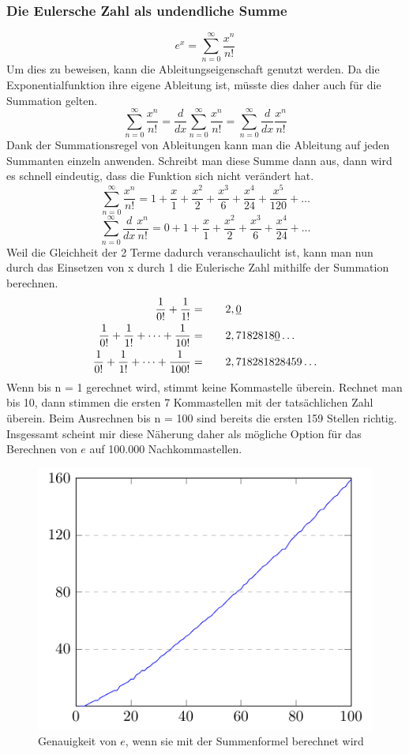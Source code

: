 \subsubsection{Die Eulersche Zahl als undendliche Summe}
\[e^x = \sum_{n=0}^\infty \frac{x^n}{n!}
  \]Um dies zu beweisen, kann die Ableitungseigenschaft genutzt werden. Da die Exponentialfunktion ihre eigene Ableitung ist, müsste dies daher auch für die Summation gelten.  \[
  \sum_{n=0}^\infty \frac{x^n}{n!} = \frac{d}{dx}\sum_{n=0}^\infty \frac{x^n}{n!} = \sum_{n=0}^\infty \frac{d}{dx}\frac{x^n}{n!} 
  \] Dank der Summationsregel von Ableitungen kann man die Ableitung auf jeden Summanten einzeln anwenden. Schreibt man diese Summe dann aus, dann wird es schnell eindeutig, dass die Funktion sich nicht verändert hat. \[
  \sum_{n=0}^\infty \frac{x^n}{n!} = 1 + \frac{x}{1} + \frac{x^2}{2} + \frac{x^3}{6} + \frac{x^4}{24} + \frac{x^5}{120} + \dots
  \] \[
  \sum_{n=0}^\infty \frac{d}{dx}\frac{x^{n}}{n!} = 0 +  1 + \frac{x}{1} + \frac{x^2}{2} + \frac{x^3}{6} + \frac{x^4}{24} + \dots
\]Weil die Gleichheit der 2 Terme dadurch veranschaulicht ist, kann man nun durch das Einsetzen von x durch 1 die Eulerische Zahl mithilfe der Summation berechnen. \[
  \begin{aligned}
    \frac{1}{0!} + \frac{1}{1!} = \indent\crel{2},\underline{0}\\
    \frac{1}{0!} + \frac{1}{1!} + \dots + \frac{1}{10!} =  \indent\crel{2},7182818\underline{0}\dots\\
    \frac{1}{0!} + \frac{1}{1!} + \dots + \frac{1}{100!} = \indent\crel{2},718281828459\dots
  \end{aligned}
\] \newpage
Wenn bis n = 1 gerechnet wird, stimmt keine Kommastelle überein. Rechnet man bis 10, dann stimmen die ersten 7 Kommastellen mit der tatsächlichen Zahl überein. Beim Ausrechnen bis n = 100 sind bereits die ersten 159 Stellen richtig. Insgessamt scheint mir diese Näherung daher als mögliche Option für das Berechnen von $e$ auf 100.000 Nachkommastellen.
\begin{figure}[h]
  \includegraphics{medien2/summation/summation.pdf}
  \centering
  \caption{Genauigkeit von $e$, wenn sie mit der Summenformel berechnet wird}
\end{figure}
